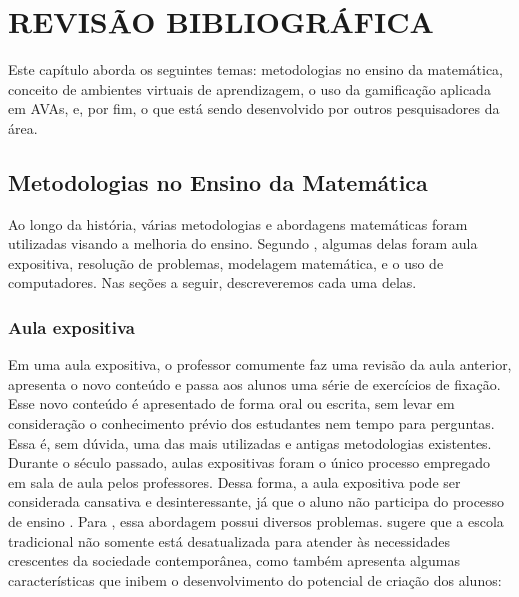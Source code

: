 \chapter{REVISÃO BIBLIOGRÁFICA}
\label{cap:fundamentacao-teorica}

Este capítulo aborda os seguintes temas: metodologias no ensino da matemática, conceito de ambientes virtuais de aprendizagem, o uso da gamificação aplicada em AVAs, e, por fim, o que está sendo 
desenvolvido por outros pesquisadores da área.

\section{Metodologias no Ensino da Matemática}

Ao longo da história, várias metodologias e abordagens matemáticas foram utilizadas visando a melhoria do ensino. Segundo , algumas delas foram aula expositiva, 
resolução de problemas, modelagem matemática, e o uso de computadores. Nas seções a seguir, descreveremos cada uma delas.

\subsection{Aula expositiva}

Em uma aula expositiva, o professor comumente faz uma revisão da aula anterior, apresenta o novo conteúdo e passa aos alunos uma série de exercícios de fixação. Esse novo conteúdo é apresentado de 
forma oral ou escrita, sem levar em consideração o conhecimento prévio dos estudantes nem tempo para perguntas. Essa é, sem dúvida, uma das mais utilizadas e antigas metodologias existentes. Durante 
o século passado, aulas expositivas foram o único processo empregado em sala de aula pelos professores. Dessa forma, a aula expositiva pode ser considerada cansativa e desinteressante, já que o aluno não participa do processo de ensino  \cite{hammes2003tendencias}. Para , essa abordagem possui diversos problemas.  sugere que a escola tradicional não somente está desatualizada para atender às necessidades 
crescentes da sociedade contemporânea, como também apresenta algumas características que inibem o desenvolvimento do potencial de criação dos alunos:

